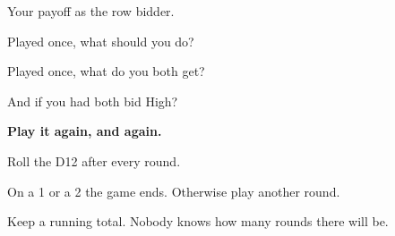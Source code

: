 \begin{minipage}[c]{0.50\linewidth}
\begin{center}
\end{center}
\end{minipage}
\hfill
\begin{minipage}[c]{0.46\linewidth}
{\large Your payoff as the row bidder.}

\vspace{1.6em}

{\large Played once, what should you do? }

\vspace{1.6em}

{\large Played once, what do you both get? }

\vspace{1.6em}

{\large And if you had both bid High? }
\end{minipage}

\newpage
{}

\vspace*{\fill}

\begin{center}
{\Huge\bfseries\color{inkblue} Play it again, and again.}

\vspace{1.8em}

{\LARGE Roll the D12 after every round.}

\vspace{0.9em}

{\LARGE On a 1 or a 2 the game ends. Otherwise play another round.}
\end{center}

\vspace*{\fill}

\begin{center}
{\large\color{inkgrey} Keep a running total. Nobody knows how many rounds
there will be.}
\end{center}

\newpage
{}

\vspace{1.6cm}

